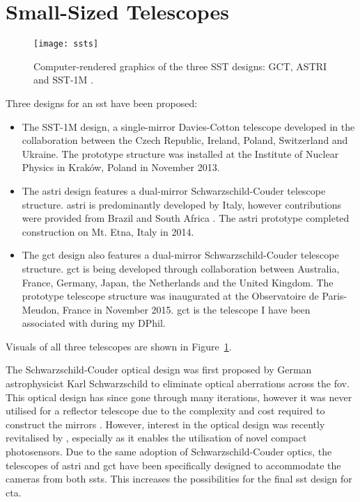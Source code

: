 \section{Small-Sized Telescopes}

\begin{figure}
	\centering\texttt{[image: ssts]} 
	\caption[The three SST designs.]{Computer-rendered graphics of the three SST designs: GCT, ASTRI and SST-1M \cite{cta-sst}.}
	\label{fig:ssts}
\end{figure}

Three designs for an \gls{sst} have been proposed:
\begin{itemize}
\item The SST-1M design, a single-mirror Davies-Cotton telescope developed in the collaboration between the Czech Republic, Ireland, Poland, Switzerland and Ukraine. The prototype structure was installed at the Institute of Nuclear Physics in Kraków, Poland in November 2013.
\item The \gls{astri} design features a dual-mirror Schwarzschild-Couder telescope structure. \gls{astri} is predominantly developed by Italy, however contributions were provided from Brazil and South Africa \cite{cta-sst}. The \gls{astri} prototype completed construction on Mt. Etna, Italy in 2014.
\item The \gls{gct} design also features a dual-mirror Schwarzschild-Couder telescope structure. \gls{gct} is being developed through collaboration between Australia, France, Germany, Japan, the Netherlands and the United Kingdom. The prototype telescope structure was inaugurated at the Observatoire de Paris-Meudon, France in November 2015. \gls{gct} is the telescope I have been associated with during my DPhil.
\end{itemize}
Visuals of all three telescopes are shown in Figure~\ref{fig:ssts}.

The Schwarzschild-Couder optical design was first proposed by German astrophysicist Karl Schwarzschild to eliminate optical aberrations across the \gls{fov}. This optical design has since gone through many iterations, however it was never utilised for a reflector telescope due to the complexity and cost required to construct the mirrors \cite{Giro2017}. However, interest in the optical design was recently revitalised by \textcite{Vassiliev2007}, especially as it enables the utilisation of novel compact photosensors. Due to the same adoption of Schwarzschild-Couder optics, the telescopes of \gls{astri} and \gls{gct} have been specifically designed to accommodate the cameras from both \glspl{sst}. This increases the possibilities for the final \gls{sst} design for \gls{cta}.

